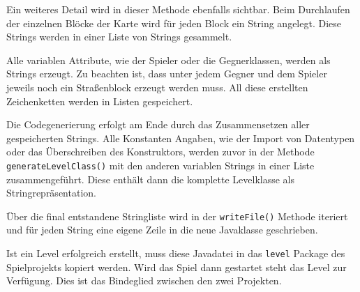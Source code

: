 Ein weiteres Detail wird in dieser Methode ebenfalls sichtbar. Beim Durchlaufen der einzelnen Blöcke der Karte wird für jeden Block ein String angelegt. Diese Strings werden in einer Liste von Strings gesammelt.

Alle variablen Attribute, wie der Spieler oder die Gegnerklassen,  werden als Strings erzeugt. Zu beachten ist, dass unter jedem Gegner und dem Spieler jeweils noch ein Straßenblock erzeugt werden muss. All diese erstellten Zeichenketten werden in Listen gespeichert. 

Die Codegenerierung erfolgt am Ende durch das Zusammensetzen aller gespeicherten Strings. Alle Konstanten Angaben, wie der Import von Datentypen oder das Überschreiben des Konstruktors, werden zuvor in der Methode \texttt{generateLevelClass()} mit den anderen variablen Strings in einer Liste zusammengeführt. Diese enthält dann die komplette Levelklasse als Stringrepräsentation.
 
Über die final entstandene Stringliste wird in der \texttt{writeFile()} Methode iteriert und für jeden String eine eigene Zeile in die neue Javaklasse geschrieben.

Ist ein Level erfolgreich erstellt, muss diese Javadatei in das \texttt{level} Package des Spielprojekts kopiert werden. Wird das Spiel dann gestartet steht das Level zur Verfügung. Dies ist das Bindeglied zwischen den zwei Projekten.
